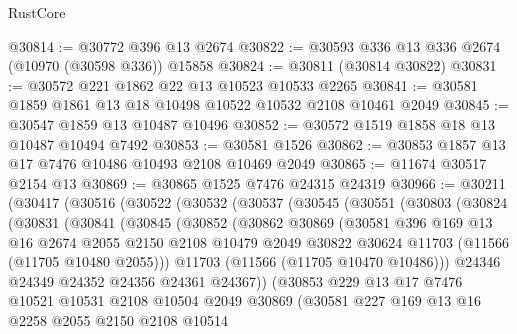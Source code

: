 \begin{lexlean}{RustCore}
\begin{coremodule}
@30814 := @30772 @396 @13 @2674
@30822 := @30593 @336 @13 @336 @2674 (@10970 (@30598 @336)) @15858
@30824 := @30811 (@30814 @30822)
@30831 := @30572 @221 @1862 @22 @13 @10523 @10533 @2265
@30841 := @30581 @1859 @1861 @13 @18 @10498 @10522 @10532 @2108 @10461 @2049
@30845 := @30547 @1859 @13 @10487 @10496
@30852 := @30572 @1519 @1858 @18 @13 @10487 @10494 @7492
@30853 := @30581 @1526
@30862 := @30853 @1857 @13 @17 @7476 @10486 @10493 @2108 @10469 @2049
@30865 := @11674 @30517 @2154 @13
@30869 := @30865 @1525 @7476 @24315 @24319
@30966 := @30211
    (@30417
      (@30516
        (@30522
          (@30532
            (@30537
              (@30545
                (@30551
                  (@30803
                    (@30824
                      (@30831
                        (@30841
                          (@30845
                            (@30852
                              (@30862
                                @30869
                                (@30581
                                  @396
                                  @169
                                  @13
                                  @16
                                  @2674
                                  @2055
                                  @2150
                                  @2108
                                  @10479
                                  @2049
                                  @30822
                                  @30624
                                  @11703
                                  (@11566 (@11705 @10480 @2055)))
                                @11703
                                (@11566 (@11705 @10470 @10486)))
                              @24346
                              @24349
                              @24352
                              @24356
                              @24361
                              @24367))
                          (@30853
                            @229
                            @13
                            @17
                            @7476
                            @10521
                            @10531
                            @2108
                            @10504
                            @2049
                            @30869
                            (@30581
                              @227
                              @169
                              @13
                              @16
                              @2258
                              @2055
                              @2150
                              @2108
                              @10514

\end{coremodule}
\end{lexlean}
